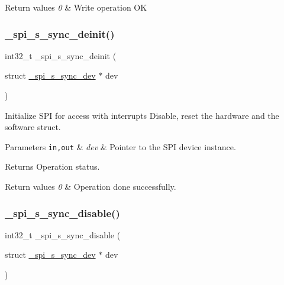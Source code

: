 \begin{DoxyRetVals}{Return values}
{\em 0} & Write operation OK \\
\hline
\end{DoxyRetVals}
\mbox{\label{group__hpl__spi_ga6f2703d1bbc1ae9e5924119709f6fadf}} 
\subsubsection{\texorpdfstring{\+\_\+spi\+\_\+s\+\_\+sync\+\_\+deinit()}{\_spi\_s\_sync\_deinit()}}
{\footnotesize\ttfamily int32\+\_\+t \+\_\+spi\+\_\+s\+\_\+sync\+\_\+deinit (\begin{DoxyParamCaption}\item[{struct \hyperlink{group__hpl__spi_ga36cf082f9d7764b69f43a52f039e7165}{\+\_\+spi\+\_\+s\+\_\+sync\+\_\+dev} $\ast$}]{dev }\end{DoxyParamCaption})}



Initialize S\+PI for access with interrupts Disable, reset the hardware and the software struct. 


\begin{DoxyParams}[1]{Parameters}
\mbox{\tt in,out}  & {\em dev} & Pointer to the S\+PI device instance. \\
\hline
\end{DoxyParams}
\begin{DoxyReturn}{Returns}
Operation status. 
\end{DoxyReturn}

\begin{DoxyRetVals}{Return values}
{\em 0} & Operation done successfully. \\
\hline
\end{DoxyRetVals}
\mbox{\label{group__hpl__spi_gaece136abe12e7e2945fcb7b28d1bb5e1}} 
\subsubsection{\texorpdfstring{\+\_\+spi\+\_\+s\+\_\+sync\+\_\+disable()}{\_spi\_s\_sync\_disable()}}
{\footnotesize\ttfamily int32\+\_\+t \+\_\+spi\+\_\+s\+\_\+sync\+\_\+disable (\begin{DoxyParamCaption}\item[{struct \hyperlink{group__hpl__spi_ga36cf082f9d7764b69f43a52f039e7165}{\+\_\+spi\+\_\+s\+\_\+sync\+\_\+dev} $\ast$}]{dev }\end{DoxyParamCaption})}



